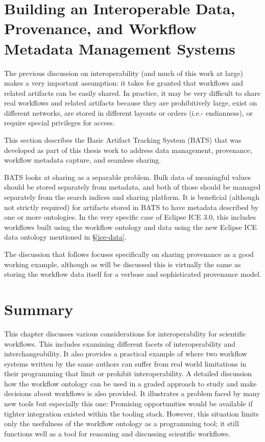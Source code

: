 \section{Building an Interoperable Data, Provenance, and Workflow Metadata
Management Systems}

The previous discussion on interoperability (and much of this work at
large) makes a very important assumption: it takes for granted that workflows
and related artifacts can be easily shared. In practice, it may be very
difficult to share real workflows and related artifacts because they are
prohibitively large, exist on different networks, are stored in different
layouts or orders (i.e.- endianness), or require special privileges for access.

This section describes the Basic Artifact Tracking System (BATS) that
was developed as part of this thesis work to address data management,
provenance, workflow metadata capture, and seamless sharing.

BATS looks at sharing as a separable problem. Bulk data of meaningful values
should be stored separately from metadata, and both of those should be managed
separately from the search indices and sharing platform. It is beneficial
(although not strictly required) for artifacts stored in BATS to have metadata
described by one or more ontologies. In the very specific case of Eclipse ICE
3.0, this includes workflows built using the workflow ontology and data using
the new Eclipse ICE data ontology mentioned in \S \ref{ice-data}.

The discussion that follows focuses specifically on sharing provenance as a good
working example, although as will be discussed this is virtually the same as
storing the workflow data itself for a verbose and sophisticated provenance
model.


\section{Summary}

This chapter discusses various considerations for interoperability for
scientific workflows. This includes examining different facets of
interoperability and interchangeability. It also provides a practical example of
where two workflow systems written by the same authors can suffer from real
world limitations in their programming that limit or prohibit interoperability.
A detailed discussion how the workflow ontology can be used in a graded approach
to study and make decisions about workflows is also provided. It illustrates a
problem faced by many new tools but especially this one: Promising 
opportunities would be available if tighter integration existed within the
tooling stack. However, this situation limits only the usefulness of the
workflow ontology as a programming tool; it still functions well as a tool for
reasoning and discussing scientific workflows.


